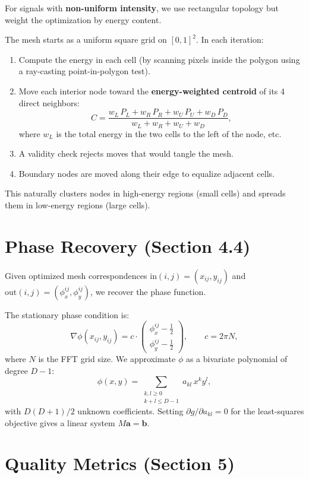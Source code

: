 \documentclass[11pt,a4paper]{article}
\begin{document}
For signals with \textbf{non-uniform intensity}, we use rectangular topology 
but weight the optimization by energy content. 

The mesh starts as a uniform square grid on $[0,1]^2$. In each iteration:
\begin{enumerate}
  \item Compute the energy in each cell (by scanning pixels inside the polygon 
    using a ray-casting point-in-polygon test).
  \item Move each interior node toward the \textbf{energy-weighted centroid} 
    of its 4 direct neighbors:
    \[
      C = \frac{w_L\, P_L + w_R\, P_R + w_U\, P_U + w_D\, P_D}
               {w_L + w_R + w_U + w_D},
    \]
    where $w_L$ is the total energy in the two cells to the left of the node, etc.
  \item A validity check rejects moves that would tangle the mesh.
  \item Boundary nodes are moved along their edge to equalize adjacent cells.
\end{enumerate}
This naturally clusters nodes in high-energy regions (small cells) and spreads 
them in low-energy regions (large cells).

\section{Phase Recovery (Section 4.4)}

Given optimized mesh correspondences $\mathrm{in}(i,j)=(x_{ij},y_{ij})$ and 
$\mathrm{out}(i,j)=(\phi_x^{ij},\phi_y^{ij})$, we recover the phase function.

The stationary phase condition is:
\[
  \nabla\phi(x_{ij},y_{ij}) = c \cdot 
  \begin{pmatrix} \phi_x^{ij} - \tfrac{1}{2} \\ \phi_y^{ij} - \tfrac{1}{2} \end{pmatrix},
  \qquad c = 2\pi N,
\]
where $N$ is the FFT grid size. We approximate $\phi$ as a bivariate polynomial 
of degree $D{-}1$:
\[
  \phi(x,y) = \sum_{\substack{k,l \ge 0 \\ k+l \le D-1}} a_{kl}\, x^k y^l,
\]
with $D(D{+}1)/2$ unknown coefficients. Setting $\partial g / \partial a_{kl} = 0$ 
for the least-squares objective gives a linear system $M\mathbf{a} = \mathbf{b}$.

\section{Quality Metrics (Section 5)}
\end{document}
